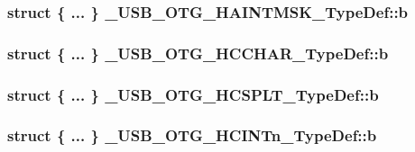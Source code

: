 \hypertarget{group___u_s_b___o_t_g___d_r_i_v_e_r_ga25171c349b89691388dcc922cdfaa435}{
\subsubsection[{b}]{\setlength{\rightskip}{0pt plus 5cm}struct \{ ... \} 
   \-\_\-\-U\-S\-B\-\_\-\-O\-T\-G\-\_\-\-H\-A\-I\-N\-T\-M\-S\-K\-\_\-\-Type\-Def\-::b}}\label{group___u_s_b___o_t_g___d_r_i_v_e_r_ga25171c349b89691388dcc922cdfaa435}
\hypertarget{group___u_s_b___o_t_g___d_r_i_v_e_r_gac2b229bd489330ca4974729b03a00a40}{
\subsubsection[{b}]{\setlength{\rightskip}{0pt plus 5cm}struct \{ ... \} 
   \-\_\-\-U\-S\-B\-\_\-\-O\-T\-G\-\_\-\-H\-C\-C\-H\-A\-R\-\_\-\-Type\-Def\-::b}}\label{group___u_s_b___o_t_g___d_r_i_v_e_r_gac2b229bd489330ca4974729b03a00a40}
\hypertarget{group___u_s_b___o_t_g___d_r_i_v_e_r_gaa7ea6e39be76343ff5107c31fa104a0e}{
\subsubsection[{b}]{\setlength{\rightskip}{0pt plus 5cm}struct \{ ... \} 
   \-\_\-\-U\-S\-B\-\_\-\-O\-T\-G\-\_\-\-H\-C\-S\-P\-L\-T\-\_\-\-Type\-Def\-::b}}\label{group___u_s_b___o_t_g___d_r_i_v_e_r_gaa7ea6e39be76343ff5107c31fa104a0e}
\hypertarget{group___u_s_b___o_t_g___d_r_i_v_e_r_gafc73126993a44639483fc2dc4279ea9d}{
\subsubsection[{b}]{\setlength{\rightskip}{0pt plus 5cm}struct \{ ... \} 
   \-\_\-\-U\-S\-B\-\_\-\-O\-T\-G\-\_\-\-H\-C\-I\-N\-Tn\-\_\-\-Type\-Def\-::b}}\label{group___u_s_b___o_t_g___d_r_i_v_e_r_gafc73126993a44639483fc2dc4279ea9d}
